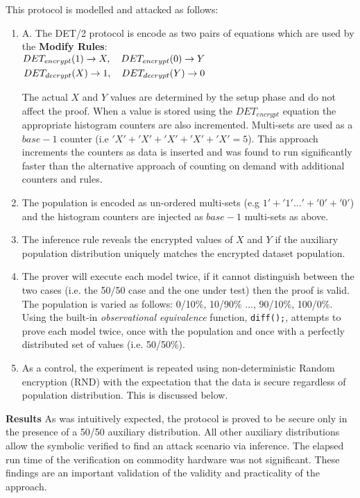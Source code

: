 \documentclass[runningheads]{llncs}
\begin{document}
This protocol is modelled and attacked as follows:
\begin{enumerate}[label=(\Alph*)]
        \item A. The DET/2 protocol is encode as two pairs of equations which are used by the \textbf{Modify Rules}:\\
        
    
    $\begin{aligned} DET_{encrypt}(1) \rightarrow X,\quad	DET_{encrypt}(0) \rightarrow Y\\
    DET_{decrypt}(X) \rightarrow  1,\quad   DET_{decrypt}(Y) \rightarrow  0 \end{aligned}\\$
    
    The actual $X$ and $Y$ values are determined by the setup phase and do not affect the proof.
	When a value is stored using the $DET_{encrypt}$ equation the appropriate histogram counters are also incremented. Multi-sets are used as a $base-1$ counter (i.e $'X'+'X'+'X'+'X'+'X' = 5$).  This approach increments the counters as data is inserted and was found to run significantly faster than the alternative approach of counting on demand with additional counters and rules.
\item The \aux{} population is encoded as un-ordered multi-sets (e.g $ 1' + '1' ... ' + '0' + '0'$) and the \aux{} histogram counters are injected as $base-1$ multi-sets as above. 
\item The inference rule reveals the encrypted values of $X$ and $Y$ if the auxiliary population distribution uniquely matches the encrypted dataset population.
\item The prover will execute each model twice, if it cannot distinguish between the two cases (i.e. the 50/50 case and the one under test) then the proof is valid. The population is varied as follows: 0/10\%, 10/90\% ..., 90/10\%, 100/0\%. 
Using the built-in \textit{observational equivalence} function, \texttt{diff();}, \tamarin{} attempts to prove each model twice, once with the \aux{} population and once with a perfectly distributed set of values (i.e. 50/50\%). 
\item As a control, the experiment is repeated using non-deterministic Random encryption (RND) with the expectation that the data is secure regardless of population distribution. This is discussed below.
\end{enumerate}
\textbf{Results} As was intuitively expected, the protocol is proved to be secure only in the presence of a 50/50 auxiliary distribution. All other auxiliary distributions allow the symbolic verified to find an attack scenario via inference. The elapsed run time of the verification on commodity hardware was not significant. These findings are an important validation of the validity and practicality of the approach.
\end{document}
